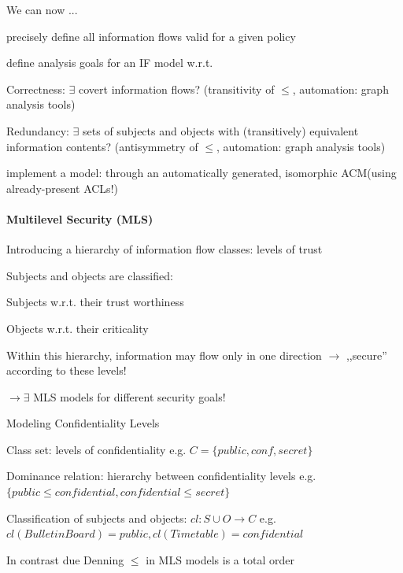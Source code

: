 \documentclass[a4paper]{article}
\begin{document}
\begin{multicols}{3}
    We can now ...
    \begin{itemize*}
        \item precisely define all information flows valid for a given policy
        \item define analysis goals for an IF model w.r.t.
        \begin{itemize*}
            \item Correctness: $\exists$ covert information flows? (transitivity of $\leq$, automation: graph analysis tools)
            \item Redundancy: $\exists$ sets of subjects and objects with (transitively) equivalent information contents? (antisymmetry of $\leq$, automation: graph analysis tools)
        \end{itemize*}
        \item implement a model: through an automatically generated, isomorphic ACM(using already-present ACLs!)
    \end{itemize*}

    \paragraph{Multilevel Security (MLS)}
    \begin{itemize*}
        \item Introducing a hierarchy of information flow classes: levels of trust
        \item Subjects and objects are classified:
        \begin{itemize*}
            \item Subjects w.r.t. their trust worthiness
            \item Objects w.r.t. their criticality
        \end{itemize*}
        \item Within this hierarchy, information may flow only in one direction $\rightarrow$ ,,secure'' according to these levels!
        \item $\rightarrow \exists$ MLS models for different security goals!
    \end{itemize*}

    Modeling Confidentiality Levels
    \begin{itemize*}
        \item Class set: levels of confidentiality e.g. $C=\{public,conf,secret\}$
        \item Dominance relation: hierarchy between confidentiality levels e.g. $\{public \leq confidential,confidential \leq secret\}$
        \item Classification of subjects and objects: $cl:S\cup O\rightarrow C$ e.g. $cl(BulletinBoard)=public,cl(Timetable)=confidential$
        \item In contrast due Denning $\leq$ in MLS models is a total order
    \end{itemize*}


\end{multicols}
\end{document}
